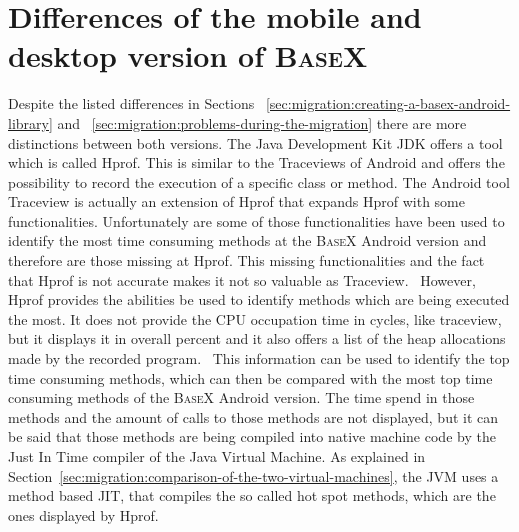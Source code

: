 
\section{Differences of the mobile and desktop version of \textsc{BaseX}}
\label{sec:differences-of-the-two-basex-versions}
Despite the listed differences in Sections ~\ref{sec:migration:creating-a-basex-android-library} and ~\ref{sec:migration:problems-during-the-migration} there are more distinctions between both versions.
The Java Development Kit JDK offers a tool which is called Hprof.
This is similar to the Traceviews of Android and offers the possibility to record the execution of a specific class or method.
The Android tool Traceview is actually an extension of Hprof that expands Hprof with some functionalities.
Unfortunately are some of those functionalities have been used to identify the most time consuming methods at the \textsc{BaseX} Android version and therefore are those missing at Hprof.
This missing functionalities and the fact that Hprof is not accurate makes it not so valuable as Traceview.~\cite{mytkowicz2010evaluating}
However, Hprof provides the abilities be used to identify methods which are being executed the most.
It does not provide the CPU occupation time in cycles, like traceview, but it displays it in overall percent and it also offers a list of the heap allocations made by the recorded program.~\cite{liang1999comprehensive}
This information can be used to identify the top time consuming methods, which can then be compared with the most top time consuming methods of the \textsc{BaseX} Android version.
The time spend in those methods and the amount of calls to those methods are not displayed, but it can be said that those methods are being compiled into native machine code by the Just In Time compiler of the Java Virtual Machine.
As explained in Section~\ref{sec:migration:comparison-of-the-two-virtual-machines}, the JVM uses a method based JIT, that compiles the so called hot spot methods, which are the ones displayed by Hprof. 


